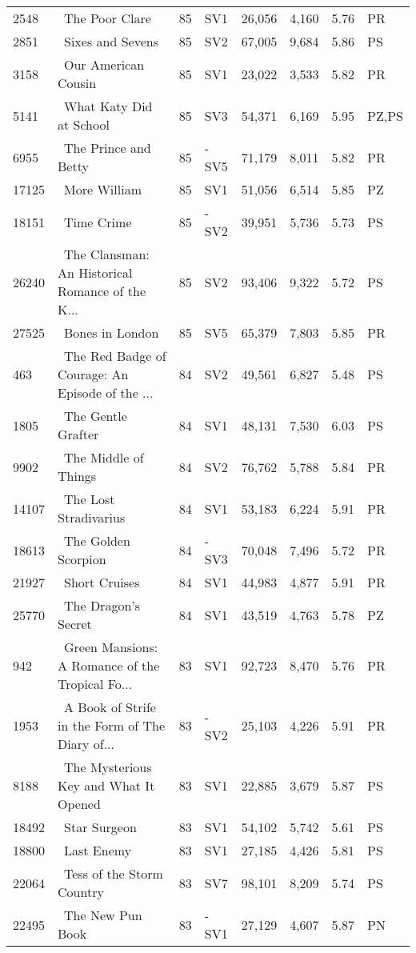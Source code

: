 \begin{longtable}{l | l | l | l | l | l | l | l}
2548 & ~The Poor Clare & 85 & SV1 & 26,056 & 4,160 & 5.76 & PR\\
2851 & ~Sixes and Sevens & 85 & SV2 & 67,005 & 9,684 & 5.86 & PS\\
3158 & ~Our American Cousin & 85 & SV1 & 23,022 & 3,533 & 5.82 & PR\\
5141 & ~What Katy Did at School & 85 & SV3 & 54,371 & 6,169 & 5.95 & PZ,PS\\
6955 & ~The Prince and Betty & 85 & -SV5 & 71,179 & 8,011 & 5.82 & PR\\
17125 & ~More William & 85 & SV1 & 51,056 & 6,514 & 5.85 & PZ\\
18151 & ~Time Crime & 85 & -SV2 & 39,951 & 5,736 & 5.73 & PS\\
26240 & ~The Clansman: An Historical Romance of the K... & 85 & SV2 & 93,406 & 9,322 & 5.72 & PS\\
27525 & ~Bones in London & 85 & SV5 & 65,379 & 7,803 & 5.85 & PR\\
463 & ~The Red Badge of Courage: An Episode of the ... & 84 & SV2 & 49,561 & 6,827 & 5.48 & PS\\
1805 & ~The Gentle Grafter & 84 & SV1 & 48,131 & 7,530 & 6.03 & PS\\
9902 & ~The Middle of Things & 84 & SV2 & 76,762 & 5,788 & 5.84 & PR\\
14107 & ~The Lost Stradivarius & 84 & SV1 & 53,183 & 6,224 & 5.91 & PR\\
18613 & ~The Golden Scorpion & 84 & -SV3 & 70,048 & 7,496 & 5.72 & PR\\
21927 & ~Short Cruises & 84 & SV1 & 44,983 & 4,877 & 5.91 & PR\\
25770 & ~The Dragon's Secret & 84 & SV1 & 43,519 & 4,763 & 5.78 & PZ\\
942 & ~Green Mansions: A Romance of the Tropical Fo... & 83 & SV1 & 92,723 & 8,470 & 5.76 & PR\\
1953 & ~A Book of Strife in the Form of The Diary of... & 83 & -SV2 & 25,103 & 4,226 & 5.91 & PR\\
8188 & ~The Mysterious Key and What It Opened & 83 & SV1 & 22,885 & 3,679 & 5.87 & PS\\
18492 & ~Star Surgeon & 83 & SV1 & 54,102 & 5,742 & 5.61 & PS\\
18800 & ~Last Enemy & 83 & SV1 & 27,185 & 4,426 & 5.81 & PS\\
22064 & ~Tess of the Storm Country & 83 & SV7 & 98,101 & 8,209 & 5.74 & PS\\
22495 & ~The New Pun Book & 83 & -SV1 & 27,129 & 4,607 & 5.87 & PN\\

\end{longtable}

